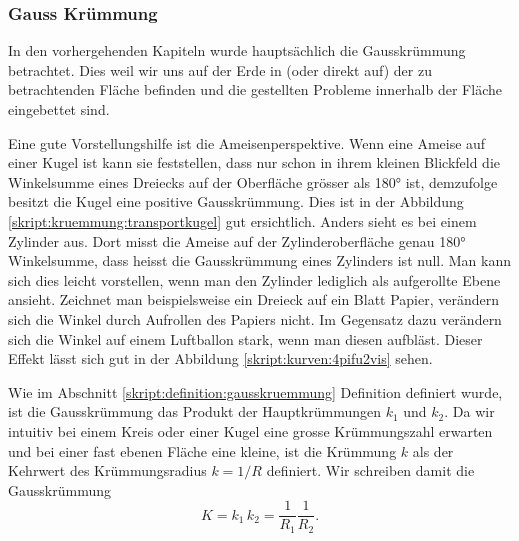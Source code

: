 \begin{refsection}
%
\subsubsection{Gauss Krümmung}
%
%
%
In den vorhergehenden Kapiteln wurde hauptsächlich die Gausskrümmung betrachtet.
Dies weil wir uns auf der Erde in (oder direkt auf) der zu betrachtenden Fläche befinden und die gestellten Probleme innerhalb der Fläche eingebettet sind.   

Eine gute Vorstellungshilfe ist die Ameisenperspektive. 
Wenn eine Ameise auf einer Kugel ist kann sie feststellen, dass nur schon in ihrem kleinen Blickfeld die Winkelsumme eines Dreiecks auf der Oberfläche grösser als 180° ist, demzufolge besitzt die Kugel eine positive Gausskrümmung. Dies ist in der Abbildung \ref{skript:kruemmung:transportkugel} gut ersichtlich. Anders sieht es bei einem Zylinder aus. Dort misst die Ameise auf der Zylinderoberfläche genau 180° Winkelsumme, dass heisst die Gausskrümmung eines Zylinders ist null. Man kann sich dies leicht vorstellen, wenn man den Zylinder lediglich als aufgerollte Ebene ansieht. Zeichnet man beispielsweise ein Dreieck auf ein Blatt Papier, verändern sich die Winkel durch Aufrollen des Papiers nicht. Im Gegensatz dazu verändern sich die Winkel auf einem Luftballon stark, wenn man diesen aufbläst. Dieser Effekt lässt sich gut in der Abbildung \ref{skript:kurven:4pifu2vis} sehen.

Wie im Abschnitt \ref{skript:definition:gausskruemmung} Definition definiert wurde, ist die Gausskrümmung das Produkt der Hauptkrümmungen $k_1$ und $k_2$. 
Da wir intuitiv bei einem Kreis oder einer Kugel eine grosse Krümmungszahl erwarten und bei einer fast ebenen Fläche eine kleine, ist die Krümmung $k$ als der Kehrwert des Krümmungsradius $k=1/R$ definiert.
Wir schreiben damit die Gausskrümmung
\begin{equation} \label{Gauss_Kruemmung_D}
 K=k_1\, k_2= \frac{1}{R_1}\frac{1}{R_2}.
\end{equation}


\end{refsection}
